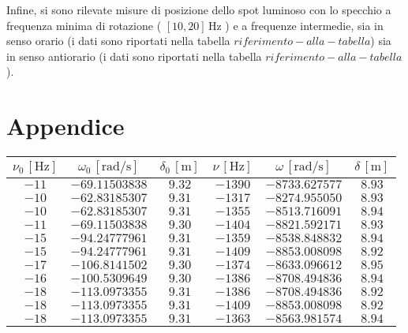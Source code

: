 \documentclass{article} %
\let\oldsection\section%
\renewcommand{\section}{%
	\renewcommand{\theequation}{\thesection.\arabic{equation}}%
	\oldsection}%
\begin{document}
    Infine, si sono rilevate misure di posizione dello spot luminoso con lo specchio a frequenza minima di rotazione ( $[10,20] \, \text{Hz}$ )
    e a frequenze intermedie, sia in senso orario (i dati sono riportati nella tabella $ riferimento-alla-tabella $) sia 
    in senso antiorario (i dati sono riportati nella tabella $ riferimento-alla-tabella $). \\
    

    \section{Appendice}

    \begin{table}
        \centering
        \begin{tabular}{||c|c|c||c|c|c||}
            \hline
            $\nu_0 \, [\text{Hz}]$ & $\omega_0 \, [\text{rad/s}]$ &  $\delta_0 \,[\text{m}]$ &  $\nu \,[\text{Hz}]$ & $\omega \,[\text{rad/s}]$ & $\delta \, [\text{m}]$ \\
            \hline\hline
            $-11 $ & $-69.11503838 $ & $ 9.32 $ & $ -1390 $ & $ -8733.627577 $ & $  8.93 $ \\\hline
            $-10 $ & $-62.83185307 $ & $ 9.31 $ & $ -1317 $ & $ -8274.955050 $ & $  8.93 $ \\\hline
            $-10 $ & $-62.83185307 $ & $ 9.31 $ & $ -1355 $ & $ -8513.716091 $ & $  8.94 $ \\\hline
            $-11 $ & $-69.11503838 $ & $ 9.30 $ & $ -1404 $ & $ -8821.592171 $ & $  8.93 $ \\\hline
            $-15 $ & $-94.24777961 $ & $ 9.31 $ & $ -1359 $ & $ -8538.848832 $ & $  8.94 $ \\\hline
            $-15 $ & $-94.24777961 $ & $ 9.31 $ & $ -1409 $ & $ -8853.008098 $ & $  8.92 $ \\\hline
            $-17 $ & $-106.8141502 $ & $ 9.30 $ & $ -1374 $ & $ -8633.096612 $ & $  8.95 $ \\\hline
            $-16 $ & $-100.5309649 $ & $ 9.30 $ & $ -1386 $ & $ -8708.494836 $ & $  8.94 $ \\\hline
            $-18 $ & $-113.0973355 $ & $ 9.31 $ & $ -1386 $ & $ -8708.494836 $ & $  8.92 $ \\\hline
            $-18 $ & $-113.0973355 $ & $ 9.31 $ & $ -1409 $ & $ -8853.008098 $ & $  8.92 $ \\\hline
            $-18 $ & $-113.0973355 $ & $ 9.31 $ & $ -1363 $ & $ -8563.981574 $ & $  8.94 $ \\\hline

\end{tabular}
\end{table}
\end{document}
